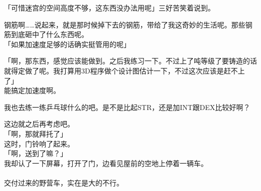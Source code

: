 「可惜迷宫的空间高度不够，这东西没办法用呢」三好苦笑着说到。

钢筋啊……说起来，就是那时候掉下去的钢筋，带给了我这奇妙的生活呢。那些钢筋到底砸中了什么东西呢。\\

「如果加速度足够的话确实挺管用的呢」

「啊，那东西，感觉应该能做到。之后我练习一下。不过上了吨等级了要铸造的话就得定做了呢。我打算用3D程序做个设计图估计一下，不过这次应该是赶不上了」\\

能搞定加速度啊。

我也去练一练乒乓球什么的吧。是不是比起STR，还是加INT跟DEX比较好啊？

这边就之后再考虑吧。\\

「啊，那就拜托了」\\

这时，门铃响了起来。\\

「啊，送到了嘛？」\\

我却认了一下屏幕，打开了门，边看见屋前的空地上停着一辆车。\\

\sqsplit\\

交付过来的野营车，实在是大的不行。\\

